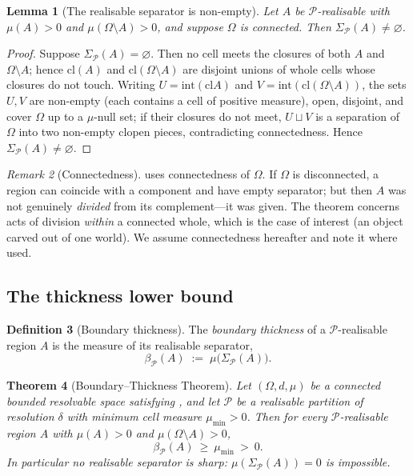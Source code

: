 \documentclass[11pt,a4paper]{article}
\theoremstyle{thmstyle}
\newtheorem{theorem}{Theorem}[section]
\newtheorem{lemma}[theorem]{Lemma}
\theoremstyle{definition}
\newtheorem{definition}[theorem]{Definition}
\theoremstyle{remark}
\newtheorem{remark}[theorem]{Remark}
\newcommand{\Space}{\Omega}
\newcommand{\interior}{\mathrm{int}}
\newcommand{\cl}{\mathrm{cl}}
\newcommand{\thick}{\beta}
\newcommand{\reso}{\delta}
\newcommand{\Part}{\mathscr{P}}
\begin{document}
\begin{lemma}[The realisable separator is non-empty]
\label{lem:nonempty-sep}
Let $A$ be $\Part$-realisable with $\mu(A)>0$ and $\mu(\Space\setminus A)>0$, and
suppose $\Space$ is connected. Then $\Sigma_\Part(A)\neq\varnothing$.
\end{lemma}

\begin{proof}
Suppose $\Sigma_\Part(A)=\varnothing$. Then no cell meets the closures of both
$A$ and $\Space\setminus A$; hence $\cl(A)$ and $\cl(\Space\setminus A)$ are
disjoint unions of whole cells whose closures do not touch. Writing
$U=\interior(\cl A)$ and $V=\interior(\cl(\Space\setminus A))$, the sets $U,V$
are non-empty (each contains a cell of positive measure), open, disjoint, and
cover $\Space$ up to a $\mu$-null set; if their closures do not meet, $U\sqcup V$
is a separation of $\Space$ into two non-empty clopen pieces, contradicting
connectedness. Hence $\Sigma_\Part(A)\neq\varnothing$.
\end{proof}

\begin{remark}[Connectedness]
 uses connectedness of $\Space$. If $\Space$ is
disconnected, a region can coincide with a component and have empty separator;
but then $A$ was not genuinely \emph{divided} from its complement---it was given.
The theorem concerns acts of division \emph{within} a connected whole, which is
the case of interest (an object carved out of one world). We assume connectedness
hereafter and note it where used.
\end{remark}

\subsection{The thickness lower bound}

\begin{definition}[Boundary thickness]
\label{def:thickness}
The \emph{boundary thickness} of a $\Part$-realisable region $A$ is the measure
of its realisable separator,
\[
\thick_\Part(A)\;:=\;\mu\bigl(\Sigma_\Part(A)\bigr).
\]
\end{definition}

\begin{theorem}[Boundary--Thickness Theorem]
\label{thm:thickness}
Let $(\Space,d,\mu)$ be a connected bounded resolvable space satisfying
, and let $\Part$ be a realisable partition of resolution $\reso$
with minimum cell measure $\mu_{\min}>0$. Then for every $\Part$-realisable
region $A$ with $\mu(A)>0$ and $\mu(\Space\setminus A)>0$,
\[
\boxed{\ \thick_\Part(A)\ \ge\ \mu_{\min}\ >\ 0.\ }
\]
In particular no realisable separator is sharp: $\mu(\Sigma_\Part(A))=0$ is
impossible.
\end{theorem}
\end{document}
